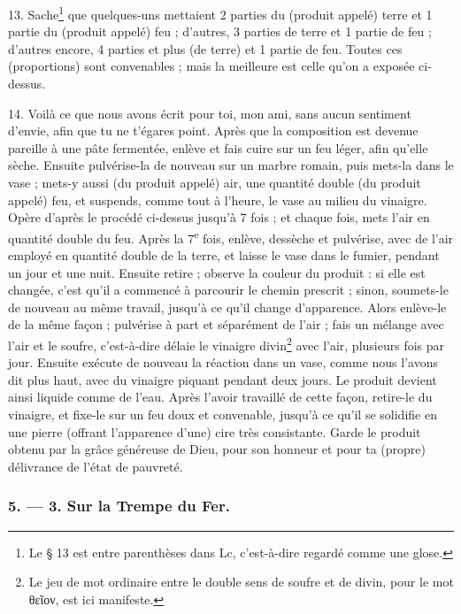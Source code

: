 \documentclass[a4paper, 11pt, oneside, polutonikogreek, french]{article}
\begin{document}
13. Sache\footnote{Le § 13 est entre parenthèses dans Lc, c'est-à-dire regardé comme une glose.} que quelques-uns mettaient 2 parties du (produit appelé) terre et 1 partie du (produit appelé) feu ; d'autres, 3 parties de terre et 1 partie de feu ; d'autres encore, 4 parties et plus (de terre) et 1 partie de feu. Toutes ces (proportions) sont convenables ; mais la meilleure est celle qu'on a exposée ci-dessus.

14. Voilà ce que nous avons écrit pour toi, mon ami, sans aucun sentiment d'envie, afin que tu ne t'égares point. Après que la composition est devenue pareille à une pâte fermentée, enlève et fais cuire sur un feu léger, afin qu'elle sèche. Ensuite pulvérise-la de nouveau sur un marbre romain, puis mets-la dans le vase ; mets-y aussi (du produit appelé) air, une quantité double (du produit appelé) feu, et suspends, comme tout à l'heure, le vase au milieu du vinaigre. Opère d'après le procédé ci-dessus jusqu'à 7 fois ; et chaque fois, mets l'air en quantité double du feu. Après la 7\textsuperscript{e} fois, enlève, dessèche et pulvérise, avec de l'air employé en quantité double de la terre, et laisse le vase dans le fumier, pendant un jour et une nuit. Ensuite retire ; observe la couleur du produit : si elle est changée, c'est qu'il a commencé à parcourir le chemin prescrit ; sinon, soumets-le de nouveau au même travail, jusqu'à ce qu'il change d'apparence. Alors enlève-le de la même façon ; pulvérise à part et séparément de l'air ; fais un mélange avec l'air et le soufre, c'est-à-dire délaie le vinaigre divin\footnote{Le jeu de mot ordinaire entre le double sens de soufre et de divin, pour le mot θεῖον, est ici manifeste.} avec l'air, plusieurs fois par jour. Ensuite exécute de nouveau la réaction dans un vase, comme nous l'avons dit plus haut, avec du vinaigre piquant pendant deux jours. Le produit devient ainsi liquide comme de l'eau. Après l'avoir travaillé de cette façon, retire-le du vinaigre, et fixe-le sur un feu doux et convenable, jusqu'à ce qu'il se solidifie en une pierre (offrant l'apparence d'une) cire très consistante. Garde le produit obtenu par la grâce généreuse de Dieu, pour son honneur et pour ta (propre) délivrance de l'état de pauvreté.

\bigskip
\centerline{\EightStarTaper}
\centerline{\EightStarTaper\EightStarTaper}
\bigskip

\subsubsection{5. --- 3. Sur la Trempe du Fer.}
\end{document}

